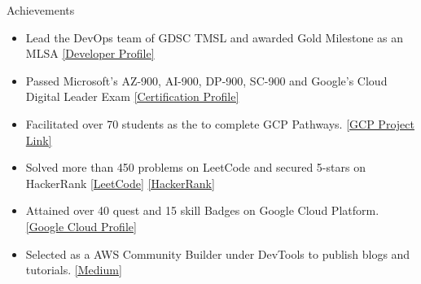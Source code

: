 \documentclass{resume} %
\begin{document}
\begin{rSection}{Achievements} 
\begin{itemize}
    \itemsep -1pt {} 
    \item 	Lead the DevOps team of GDSC TMSL and awarded Gold Milestone as an MLSA \href{https://gdsc.community.dev/techno-main-salt-lake-kolkata/}{[Developer Profile]}
    \item 	Passed Microsoft's AZ-900, AI-900, DP-900, SC-900 and Google's Cloud Digital Leader Exam \href{https://docs.microsoft.com/en-us/users/sabyasachiseal-9602/certifications}{[Certification Profile]}
    \item	Facilitated over 70 students as the to complete GCP Pathways.
    \href{https://cloudskillsboostprogresstracker-j44zd2vilq-uc.a.run.app/}{[GCP Project Link]}
    \item	Solved more than 450 problems on LeetCode and secured 5-stars on HackerRank
    \href{https://leetcode.com/sabyasachiseal/}{[LeetCode]}
    \href{https://www.hackerrank.com/yoboy907}{[HackerRank]}
    \item	Attained over 40 quest and 15 skill Badges on Google Cloud Platform.
    \href{https://www.cloudskillsboost.google/public_profiles/e3e3af1f-e2c8-48b5-ae19-175dee7b6ef5}{[Google Cloud Profile]}
    \item	Selected as a AWS Community Builder under DevTools to publish blogs and tutorials.
    \href{https://www.cloudskillsboost.google/public_profiles/e3e3af1f-e2c8-48b5-ae19-175dee7b6ef5}{[Medium]}
\end{itemize}


\end{rSection}

\end{document}
